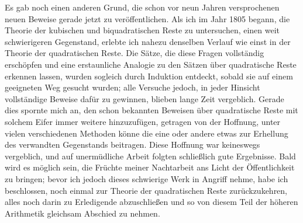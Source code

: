 \newpage
Es gab noch einen anderen Grund, die schon vor neun Jahren versprochenen neuen Beweise gerade jetzt zu veröffentlichen. Als ich im Jahr 1805 begann, die Theorie der kubischen und biquadratischen Reste zu untersuchen, einen weit schwierigeren Gegenstand, erlebte ich nahezu denselben Verlauf wie einst in der Theorie der quadratischen Reste. Die Sätze, die diese Fragen vollständig erschöpfen und eine erstaunliche Analogie zu den Sätzen über quadratische Reste erkennen lassen, wurden sogleich durch Induktion entdeckt, sobald sie auf einem geeigneten Weg gesucht wurden; alle Versuche jedoch, in jeder Hinsicht vollständige Beweise dafür zu gewinnen, blieben lange Zeit vergeblich. Gerade dies spornte mich an, den schon bekannten Beweisen über quadratische Reste mit solchem Eifer immer weitere hinzuzufügen, getragen von der Hoffnung, unter vielen verschiedenen Methoden könne die eine oder andere etwas zur Erhellung des verwandten Gegenstands beitragen. Diese Hoffnung war keineswegs vergeblich, und auf unermüdliche Arbeit folgten schließlich gute Ergebnisse. Bald wird es möglich sein, die Früchte meiner Nachtarbeit ans Licht der Öffentlichkeit zu bringen; bevor ich jedoch dieses schwierige Werk in Angriff nehme, habe ich beschlossen, noch einmal zur Theorie der quadratischen Reste zurückzukehren, alles noch darin zu Erledigende abzuschließen und so von diesem Teil der höheren Arithmetik gleichsam Abschied zu nehmen.

